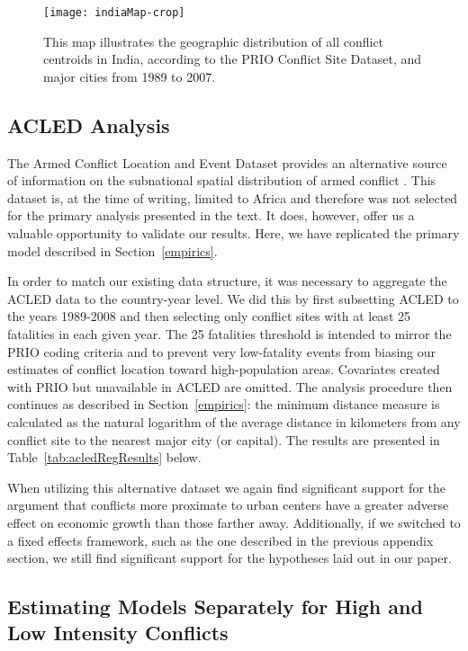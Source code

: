 \begin{figure}[ht]
	\centering
	\texttt{[image: indiaMap-crop]}
	\caption{This map illustrates the geographic distribution of all conflict centroids in India, according to the PRIO Conflict Site Dataset, and major cities from 1989 to 2007. }
	\label{fig:indiaMap}
\end{figure}

\newpage
\subsection{ACLED Analysis}
\label{acled}

The Armed Conflict Location and Event Dataset provides an alternative source of information on the subnational spatial distribution of armed conflict \citep{raleigh:linke:etal:2010}. This dataset is, at the time of writing, limited to Africa and therefore was not selected for the primary analysis presented in the text. It does, however, offer us a valuable opportunity to validate our results. Here, we have replicated the primary model described in Section~\ref{empirics}.

In order to match our existing data structure, it was necessary to aggregate the ACLED data to the country-year level. We did this by first subsetting ACLED to the years 1989-2008 and then selecting only conflict sites with at least 25 fatalities in each given year. The 25 fatalities threshold is intended to mirror the PRIO coding criteria and to prevent very low-fatality events from biasing our estimates of conflict location toward high-population areas. Covariates created with PRIO but unavailable in ACLED are omitted. The analysis procedure then continues as described in Section~\ref{empirics}: the minimum distance measure is calculated as the natural logarithm of the average distance in kilometers from any conflict site to the nearest major city (or capital). The results are presented in Table~\ref{tab:acledRegResults} below. 

When utilizing this alternative dataset we again find significant support for the argument that conflicts more proximate to urban centers have a greater adverse effect on economic growth than those farther away. Additionally, if we switched to a fixed effects framework, such as the one described in the previous appendix section, we still find significant support for the hypotheses laid out in our paper.


\FloatBarrier

\newpage
\subsection{Estimating Models Separately for High and Low Intensity Conflicts}

